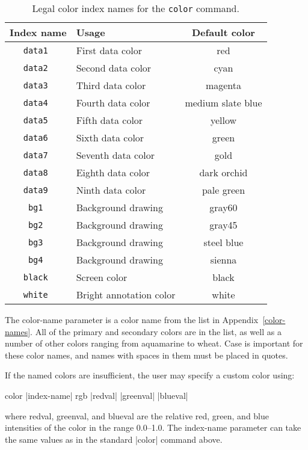 \begin{table}[tp]
	\begin{center}
	\begin{tabular}{|c|l|c|}
		\hline
		Index name	& Usage			& Default color \\ 
		\hline\hline
		\tt data1	& First data color 	& red \\
		\tt data2	& Second data color	& cyan \\
		\tt data3	& Third data color	& magenta \\
		\tt data4	& Fourth data color	& medium slate blue \\
		\tt data5	& Fifth data color	& yellow \\
		\tt data6	& Sixth data color	& green \\
		\tt data7	& Seventh data color	& gold \\
		\tt data8	& Eighth data color	& dark orchid \\
		\tt data9	& Ninth data color	& pale green \\
		\tt bg1		& Background drawing	& gray60 \\
		\tt bg2		& Background drawing	& gray45 \\
		\tt bg3		& Background drawing	& steel blue \\
		\tt bg4		& Background drawing	& sienna \\
		\tt black	& Screen color		& black \\
		\tt white	& Bright annotation color & white \\
		\hline
	\end{tabular}
	\end{center}
	\caption{Legal color index names for the {\tt color} command.}
	\label{tbl-clrndx}
\end{table}

The {\pf color-name} parameter is a color name from the list in 
Appendix~\ref{color-names}.  All of the primary and secondary colors are in the
list, as well as a number of other colors ranging from aquamarine to wheat.
Case is important for these color names, and names with spaces in them must
be placed in quotes.

If the named colors are insufficient, the user may specify a custom color
using:
\begin{example}
	color |index-name| rgb |redval| |greenval| |blueval|
\end{example}
where {\pf redval}, {\pf greenval}, and {\pf blueval} are the relative red,
green, and blue intensities of the color in the range 0.0--1.0.  The 
{\pf index-name} parameter can take the same values as in the standard
|color| command above.

